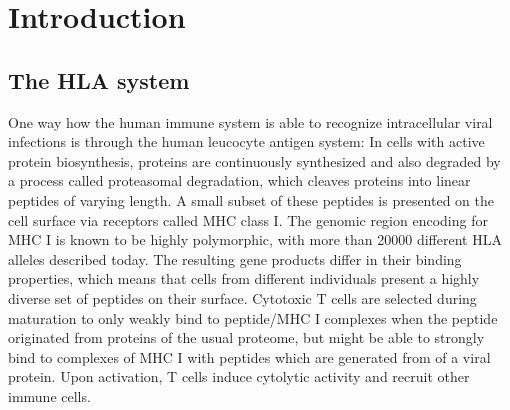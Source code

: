 \documentclass[fleqn,11pt]{SelfArx} %
\affiliation{\textsuperscript{1}\textit{Bioinformatics \& Computational Biophysics, Faculty of Biology, University of Duisburg-Essen, 45117 Essen, Germany}} %
\begin{document}
\flushbottom %

\maketitle %

{
  \hypersetup{linkcolor=black}
  \tableofcontents
}

\pagebreak

\section{Introduction}



\subsection{The HLA system}

One way how the human immune system is able to recognize intracellular viral infections
is through the human leucocyte antigen system:
In cells with active protein biosynthesis, proteins are continuously synthesized
and also degraded by a process called proteasomal degradation, which cleaves
proteins into linear peptides of varying length.
A small subset of these peptides is presented on the cell surface via
receptors called MHC class I. The genomic region encoding for MHC I is known to be
highly polymorphic, with more than 20000 different HLA alleles described today.
The resulting gene products differ in their binding properties, which means that
cells from different individuals present a highly diverse set of peptides on their
surface.
Cytotoxic T cells are selected during maturation to only weakly bind to 
peptide/MHC I complexes when the peptide originated from proteins of the usual proteome, 
but might be able to strongly bind to complexes of MHC I with peptides which are 
generated from of a viral protein.
Upon activation, T cells induce cytolytic activity and recruit other immune cells.
\end{document}
